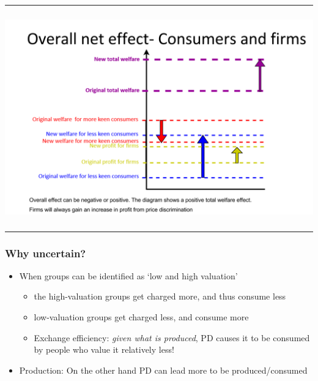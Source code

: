 \documentclass[]{article}
\providecommand{\tightlist}{%
  \setlength{\itemsep}{0pt}\setlength{\parskip}{0pt}}
\begin{document}
\begin{center}\rule{0.5\linewidth}{\linethickness}\end{center}

\includegraphics[height=3.5in]{picsfigs/pdwelfareoverall.png}

\begin{center}\rule{0.5\linewidth}{\linethickness}\end{center}

\hypertarget{why-uncertain}{%
\subsubsection{Why uncertain?}\label{why-uncertain}}

\begin{itemize}
\tightlist
\item
  When groups can be identified as `low and high valuation'

  \begin{itemize}
  \tightlist
  \item
    the high-valuation groups get charged more, and thus consume less
  \item
    low-valuation groups get charged less, and consume more
  \item
    Exchange efficiency: \emph{given what is produced}, PD causes it to be consumed by people who value it relatively less!
  \end{itemize}
\end{itemize}

\begin{itemize}
\tightlist
\item
  Production: On the other hand PD can lead more to be produced/consumed
\end{itemize}
\end{document}
